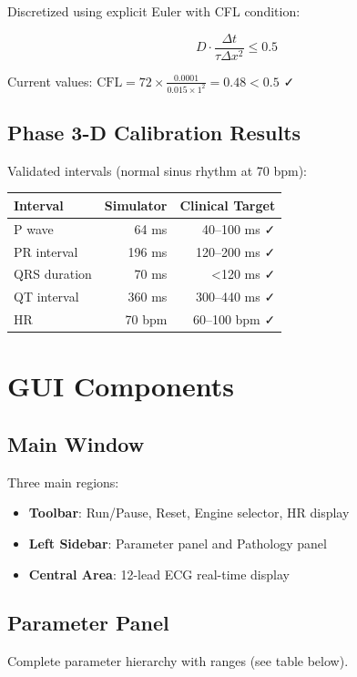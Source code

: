 \documentclass[12pt,a4paper]{article}
\begin{document}
Discretized using explicit Euler with CFL condition:

$$D \cdot \frac{\Delta t}{\tau \Delta x^2} \le 0.5$$

Current values: $\text{CFL} = 72 \times \frac{0.0001}{0.015 \times 1^2} = 0.48 < 0.5$ ✓

\subsection{Phase 3-D Calibration Results}

Validated intervals (normal sinus rhythm at 70 bpm):

\begin{tabular}{|l|r|r|}
\hline
\textbf{Interval} & \textbf{Simulator} & \textbf{Clinical Target} \\
\hline
P wave & 64 ms & 40--100 ms ✓ \\
PR interval & 196 ms & 120--200 ms ✓ \\
QRS duration & 70 ms & <120 ms ✓ \\
QT interval & 360 ms & 300--440 ms ✓ \\
HR & 70 bpm & 60--100 bpm ✓ \\
\hline
\end{tabular}

\section{GUI Components}

\subsection{Main Window}

Three main regions:
\begin{itemize}
    \item \textbf{Toolbar}: Run/Pause, Reset, Engine selector, HR display
    \item \textbf{Left Sidebar}: Parameter panel and Pathology panel
    \item \textbf{Central Area}: 12-lead ECG real-time display
\end{itemize}

\subsection{Parameter Panel}

Complete parameter hierarchy with ranges (see table below).
\end{document}
